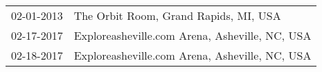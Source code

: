 \begin{supertabular}{ll}
 02-01-2013 &           The Orbit Room, Grand Rapids, MI, USA \\
 02-17-2017 &  Exploreasheville.com Arena, Asheville, NC, USA \\
 02-18-2017 &  Exploreasheville.com Arena, Asheville, NC, USA \\
\end{supertabular}
